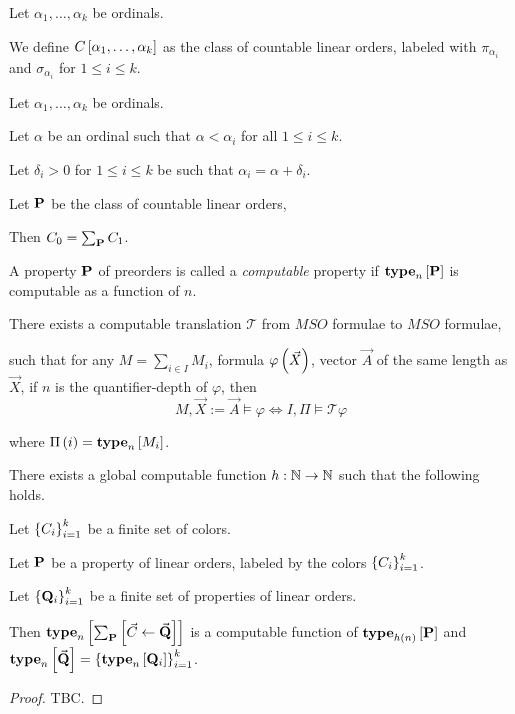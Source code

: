 \begin{definition}
  Let $\alpha_1, \ldots, \alpha_k$ be ordinals.

  We define $C \left[ {\alpha_1, \ldots, \alpha_k} \right]$ as the class of
  countable linear orders, labeled with
  $\pi_{\alpha_i}$ and $\sigma_{\alpha_i}$ for $1 \le i \le k$.
\end{definition}

\begin{theorem}
  Let $\alpha_1, \ldots, \alpha_k$ be ordinals.

  Let $\alpha$ be an ordinal such that $\alpha < \alpha_i$
  for all $1 \le i \le k$.

  Let $\delta_i > 0$ for $1 \le i \le k$ be such that
  $\alpha_i = \alpha + \delta_i$.



  Let $\mathbf{P}$ be the class of countable linear orders,

  Then $C_0 = \sum_{\mathbf{P}}{C_1}$.

\end{theorem}



\begin{definition}
  A property $\mathbf{P}$ of preorders is called a
  \emph{computable} property if
  $\mathbf{type}_{n} \left[ {\mathbf{P}} \right]$ is computable as a function of $n$.
\end{definition}

\begin{theorem}
  There exists a computable translation $\mathcal{T}$
  from $MSO$ formulae to $MSO$ formulae,

  such that for any $M = \sum_{i \in I} M_i$,
  formula $\varphi \left( {\vec{X}} \right)$,
  vector $\vec{A}$ of the same length as $\vec{X}$,
  if $n$ is the quantifier-depth of $\varphi$,
  then
  \[
    M, \vec{X} := \vec{A} \models \varphi \iff I, \Pi \models \mathcal{T} {\varphi}
  \]

  where $\Pi \left( {i} \right) = \mathbf{type}_{n} \left[ {M_i} \right]$.
\end{theorem}

\begin{lemma}
  There exists a global computable function
  $h : \mathbb{N} \to \mathbb{N}$ such that the following holds.

  Let $\left\{ {C_i} \right\}_{i=1}^k$ be a finite set of colors.

  Let $\mathbf{P}$ be a property of linear orders, labeled
  by the colors $\left\{ {C_i} \right\}_{i=1}^k$.

  Let $\left\{ {\mathbf{Q}_i} \right\}_{i=1}^k$ be a finite set of properties of linear orders.

  Then $\mathbf{type}_{n} \left[ {\sum_{\mathbf{P}} \left[ {{\vec{C}} \leftarrow {\vec{\mathbf{Q}}}} \right]} \right]$ is
  a computable function of $\mathbf{type}_{h(n)} \left[ {\mathbf{P}} \right]$
  and $\mathbf{type}_{n} \left[ {\vec{\mathbf{Q}}} \right] = \left\{ {\mathbf{type}_{n} \left[ {\mathbf{Q}_i} \right]} \right\}_{i=1}^k$.
\end{lemma}

\begin{proof}
  TBC.
\end{proof}
